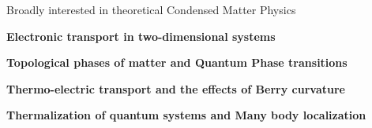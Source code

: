

\begin{cventries}

  \cventry
    {} %
    {Broadly interested in theoretical Condensed Matter Physics} %
    {} %
    {} %
    {
      \begin{cvitems} %
      	\item {\textbf{Electronic transport in two-dimensional systems}}
        \item {\textbf{Topological phases of matter and Quantum Phase transitions}}
        \item {\textbf{Thermo-electric transport and the effects of Berry curvature}}
        \item {\textbf{Thermalization of quantum systems and Many body localization}}
      \end{cvitems}
    }

\end{cventries}
